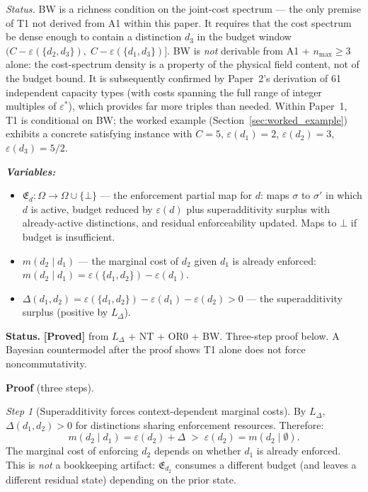 \documentclass[11pt]{article}
\theoremstyle{remark}
\newenvironment{varlist}{\begin{itemize}[nosep,leftmargin=2em]}{\end{itemize}}
\begin{document}
\begin{tcolorbox}[apfbox, title={Theorem T1 --- The Bridge Theorem (Order-Dependence)}]
\begin{varlist}
\textit{Status.}  BW is a richness condition on the joint-cost spectrum --- the only premise of T1 not derived from A1 within this paper.  It requires that the cost spectrum be dense enough to contain a distinction $d_3$ in the budget window $(C - \varepsilon(\{d_2,d_3\}),\; C - \varepsilon(\{d_1,d_3\})]$.  BW is \emph{not} derivable from A1 + $n_{\max} \ge 3$ alone: the cost-spectrum density is a property of the physical field content, not of the budget bound.  It is subsequently confirmed by Paper~2's derivation of 61 independent capacity types (with costs spanning the full range of integer multiples of $\varepsilon^*$), which provides far more triples than needed.  Within Paper~1, T1 is conditional on BW; the worked example (Section~\ref{sec:worked_example}) exhibits a concrete satisfying instance with $C = 5$, $\varepsilon(d_1) = 2$, $\varepsilon(d_2) = 3$, $\varepsilon(d_3) = 5/2$.
\end{varlist}

\smallskip\noindent\textbf{\textit{Variables:}}
\begin{varlist}
\item $\mathfrak{E}_{d}: \Omega \to \Omega \cup \{\bot\}$ --- the enforcement partial map for $d$: maps $\sigma$ to $\sigma'$ in which $d$ is active, budget reduced by $\varepsilon(d)$ plus superadditivity surplus with already-active distinctions, and residual enforceability updated.  Maps to $\bot$ if budget is insufficient.
\item $m(d_2 \mid d_1)$ --- the marginal cost of $d_2$ given $d_1$ is already enforced: $m(d_2 \mid d_1) = \varepsilon(\{d_1, d_2\}) - \varepsilon(d_1)$.
\item $\Delta(d_1, d_2) = \varepsilon(\{d_1, d_2\}) - \varepsilon(d_1) - \varepsilon(d_2) > 0$ --- the superadditivity surplus (positive by $L_\Delta$).
\end{varlist}

\smallskip\noindent\textbf{Status.}  \textbf{[Proved]} from $L_\Delta$ + NT + OR0 + BW.  Three-step proof below.  A Bayesian countermodel after the proof shows T1 alone does not force noncommutativity.

\smallskip\noindent\textbf{Proof} (three steps).

\textit{Step 1} (Superadditivity forces context-dependent marginal costs).  By $L_\Delta$, $\Delta(d_1, d_2) > 0$ for distinctions sharing enforcement resources.  Therefore:
\begin{equation}
m(d_2 \mid d_1) = \varepsilon(d_2) + \Delta \;>\; \varepsilon(d_2) = m(d_2 \mid \emptyset).
\end{equation}
The marginal cost of enforcing $d_2$ depends on whether $d_1$ is already enforced.  This is \emph{not} a bookkeeping artifact: $\mathfrak{E}_{d_2}$ consumes a different budget (and leaves a different residual state) depending on the prior state.


\end{tcolorbox}
\end{document}
